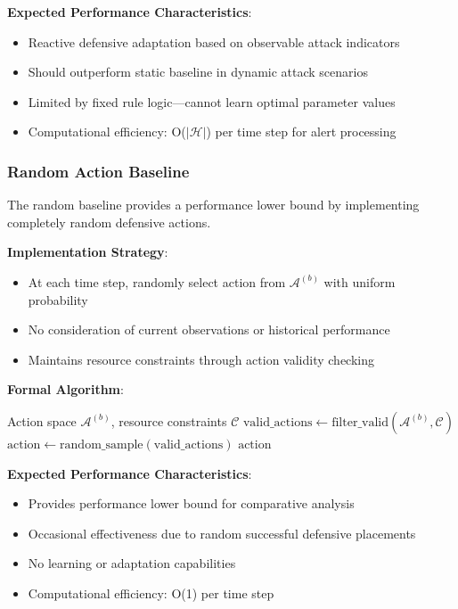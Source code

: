\documentclass[12pt]{article}
\theoremstyle{definition}
\theoremstyle{plain}
\begin{document}
\textbf{Expected Performance Characteristics}:
\begin{itemize}
    \item Reactive defensive adaptation based on observable attack indicators
    \item Should outperform static baseline in dynamic attack scenarios
    \item Limited by fixed rule logic—cannot learn optimal parameter values
    \item Computational efficiency: O($|\mathcal{H}|$) per time step for alert processing
\end{itemize}

\subsubsection{Random Action Baseline}

The random baseline provides a performance lower bound by implementing completely random defensive actions.

\textbf{Implementation Strategy}:
\begin{itemize}
    \item At each time step, randomly select action from $\mathcal{A}^{(b)}$ with uniform probability
    \item No consideration of current observations or historical performance
    \item Maintains resource constraints through action validity checking
\end{itemize}

\textbf{Formal Algorithm}:
\begin{algorithm}[H]
\caption{Random Action Baseline}
\label{alg:random_baseline}
\begin{algorithmic}[1]
\REQUIRE Action space $\mathcal{A}^{(b)}$, resource constraints $\mathcal{C}$
\STATE $\text{valid\_actions} \leftarrow \text{filter\_valid}(\mathcal{A}^{(b)}, \mathcal{C})$
\STATE $\text{action} \leftarrow \text{random\_sample}(\text{valid\_actions})$
\RETURN $\text{action}$
\end{algorithmic}
\end{algorithm}

\textbf{Expected Performance Characteristics}:
\begin{itemize}
    \item Provides performance lower bound for comparative analysis
    \item Occasional effectiveness due to random successful defensive placements
    \item No learning or adaptation capabilities
    \item Computational efficiency: O(1) per time step
\end{itemize}
\end{document}
